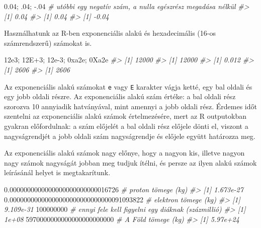 \documentclass[
]{book}
\newenvironment{Shaded}{\begin{snugshade}}{\end{snugshade}}
\newcommand{\CommentTok}[1]{\textcolor[rgb]{0.56,0.35,0.01}{\textit{#1}}}
\newcommand{\DecValTok}[1]{\textcolor[rgb]{0.00,0.00,0.81}{#1}}
\newcommand{\FloatTok}[1]{\textcolor[rgb]{0.00,0.00,0.81}{#1}}
\newcommand{\NormalTok}[1]{#1}
\newcommand{\SpecialCharTok}[1]{\textcolor[rgb]{0.00,0.00,0.00}{#1}}
\begin{document}
\begin{Shaded}
\begin{Highlighting}[]
\FloatTok{0.04}\NormalTok{; .}\DecValTok{04}\NormalTok{; }\SpecialCharTok{{-}}\NormalTok{.}\DecValTok{04} \CommentTok{\# utóbbi egy negatív szám, a nulla egészrész megadása nélkül}
\CommentTok{\#\textgreater{} [1] 0.04}
\CommentTok{\#\textgreater{} [1] 0.04}
\CommentTok{\#\textgreater{} [1] {-}0.04}
\end{Highlighting}
\end{Shaded}

Használhatunk az R-ben exponenciális alakú és hexadecimális (16-os számrendszerű) számokat is.

\begin{Shaded}
\begin{Highlighting}[]
\FloatTok{12e3}\NormalTok{; }\FloatTok{12E+3}\NormalTok{; }\FloatTok{12e{-}3}\NormalTok{; }\DecValTok{0xa2e}\NormalTok{; }\DecValTok{0Xa2e}
\CommentTok{\#\textgreater{} [1] 12000}
\CommentTok{\#\textgreater{} [1] 12000}
\CommentTok{\#\textgreater{} [1] 0.012}
\CommentTok{\#\textgreater{} [1] 2606}
\CommentTok{\#\textgreater{} [1] 2606}
\end{Highlighting}
\end{Shaded}

Az exponenciális alakú számokat \texttt{e} vagy \texttt{E} karakter vágja ketté, egy bal oldali és egy jobb oldali részre. Az exponenciális alakú szám értéke: a bal oldali rész szorozva 10 annyiadik hatványával, mint amennyi a jobb oldali rész. Érdemes időt szentelni az exponenciális alakú számok értelmezésére, mert az R outputokban gyakran előfordulnak: a szám előjelét a bal oldali rész előjele dönti el, viszont a nagyságrendjét a jobb oldali szám nagyságrendje és előjele együtt határozza meg.

Az exponenciális alakú számok nagy előnye, hogy a nagyon kis, illetve nagyon nagy számok nagyságát jobban meg tudjuk ítélni, és persze az ilyen alakú számok leírásánál helyet is megtakarítunk.

\begin{Shaded}
\begin{Highlighting}[]
\FloatTok{0.0000000000000000000000000016726}         \CommentTok{\# proton tömege (kg)}
\CommentTok{\#\textgreater{} [1] 1.673e{-}27}
\FloatTok{0.00000000000000000000000000000091093822}  \CommentTok{\# elektron tömege (kg)}
\CommentTok{\#\textgreater{} [1] 9.109e{-}31}
\DecValTok{100000000}        \CommentTok{\# ennyi fele kell figyelni egy diáknak (százmillió)}
\CommentTok{\#\textgreater{} [1] 1e+08}
\DecValTok{5970000000000000000000000}                 \CommentTok{\# A Föld tömege (kg)}
\CommentTok{\#\textgreater{} [1] 5.97e+24}
\end{Highlighting}
\end{Shaded}
\end{document}
